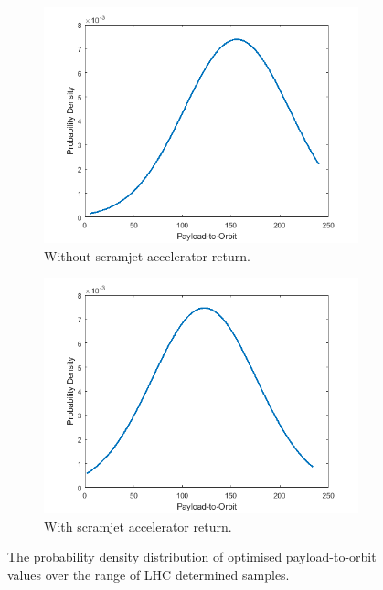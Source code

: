 \begin{figure}[ht]
	\centering
	\begin{subfigure}{.45\textwidth}
	\includegraphics[width=0.99\linewidth]{figures/A1_uncertainty-analysis/PDFNoReturn}
	\caption{Without scramjet accelerator return.}
	\end{subfigure}
	\begin{subfigure}{.45\textwidth}
		\includegraphics[width=0.99\linewidth]{figures/A1_uncertainty-analysis/PDFReturn}
		\caption{With scramjet accelerator return.}
	\end{subfigure}
	\caption{The probability density distribution of optimised payload-to-orbit values over the range of LHC determined samples.}
	\label{fig:PDFNoReturn}
\end{figure}

